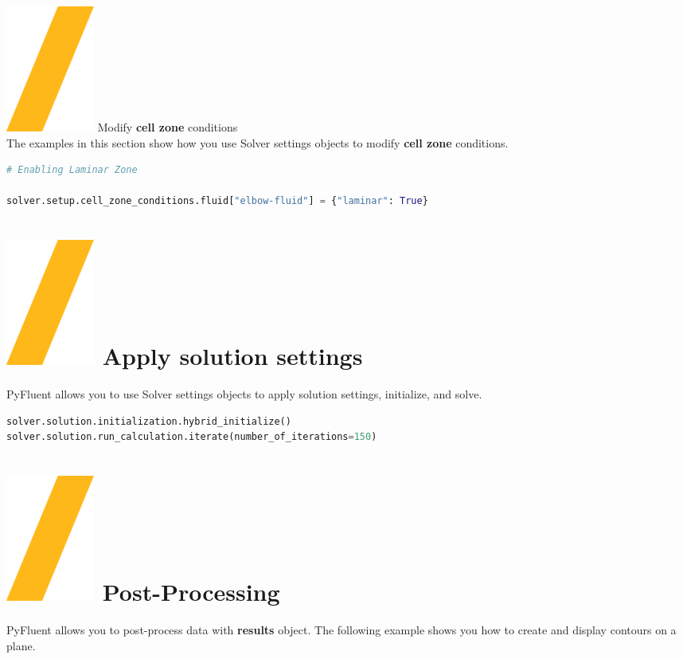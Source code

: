 \documentclass[9pt,landscape]{article}
\begin{document}
\begin{multicols}{3}
{\vfill
{\includegraphics[height=\fontcharht\font`\S]{slash.png}  Modify \textbf{cell zone} conditions} \\
The examples in this section show how you use Solver settings objects to modify \textbf{cell zone} conditions.
\begin{lstlisting}[language=Python]
# Enabling Laminar Zone

solver.setup.cell_zone_conditions.fluid["elbow-fluid"] = {"laminar": True}  
\end{lstlisting}
\vfill

\vfill
\section{\includegraphics[height=\fontcharht\font`\S]{slash.png}  Apply solution settings}
PyFluent allows you to use Solver settings objects to apply
solution settings, initialize, and solve.

\begin{lstlisting}[language=Python]
solver.solution.initialization.hybrid_initialize()
solver.solution.run_calculation.iterate(number_of_iterations=150)
\end{lstlisting}

\section{\includegraphics[height=\fontcharht\font`\S]{slash.png}  Post-Processing}
PyFluent allows you to post-process data with \textbf{results} object. The following example shows you how to create and display contours on a plane.

}
\end{multicols}
\end{document}
